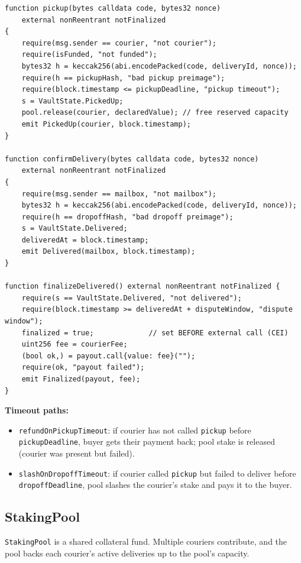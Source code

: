 \documentclass[12pt,a4paper]{article}
\begin{document}
\begin{lstlisting}[language=Solidity, caption=Core enforcement in DeliveryVault.sol (simplified)]
function pickup(bytes calldata code, bytes32 nonce)
    external nonReentrant notFinalized
{
    require(msg.sender == courier, "not courier");
    require(isFunded, "not funded");
    bytes32 h = keccak256(abi.encodePacked(code, deliveryId, nonce));
    require(h == pickupHash, "bad pickup preimage");
    require(block.timestamp <= pickupDeadline, "pickup timeout");
    s = VaultState.PickedUp;
    pool.release(courier, declaredValue); // free reserved capacity
    emit PickedUp(courier, block.timestamp);
}

function confirmDelivery(bytes calldata code, bytes32 nonce)
    external nonReentrant notFinalized
{
    require(msg.sender == mailbox, "not mailbox");
    bytes32 h = keccak256(abi.encodePacked(code, deliveryId, nonce));
    require(h == dropoffHash, "bad dropoff preimage");
    s = VaultState.Delivered;
    deliveredAt = block.timestamp;
    emit Delivered(mailbox, block.timestamp);
}

function finalizeDelivered() external nonReentrant notFinalized {
    require(s == VaultState.Delivered, "not delivered");
    require(block.timestamp >= deliveredAt + disputeWindow, "dispute window");
    finalized = true;             // set BEFORE external call (CEI)
    uint256 fee = courierFee;
    (bool ok,) = payout.call{value: fee}("");
    require(ok, "payout failed");
    emit Finalized(payout, fee);
}
\end{lstlisting}

\textbf{Timeout paths:}
\begin{itemize}
    \item \texttt{refundOnPickupTimeout}: if courier has not called \texttt{pickup} before \texttt{pickupDeadline}, buyer gets their payment back; pool stake is released (courier was present but failed).
    \item \texttt{slashOnDropoffTimeout}: if courier called \texttt{pickup} but failed to deliver before \texttt{dropoffDeadline}, pool slashes the courier's stake and pays it to the buyer.
\end{itemize}

\subsection{StakingPool}

\texttt{StakingPool} is a shared collateral fund. Multiple couriers contribute, and the pool backs each courier's active deliveries up to the pool's capacity.
\end{document}
